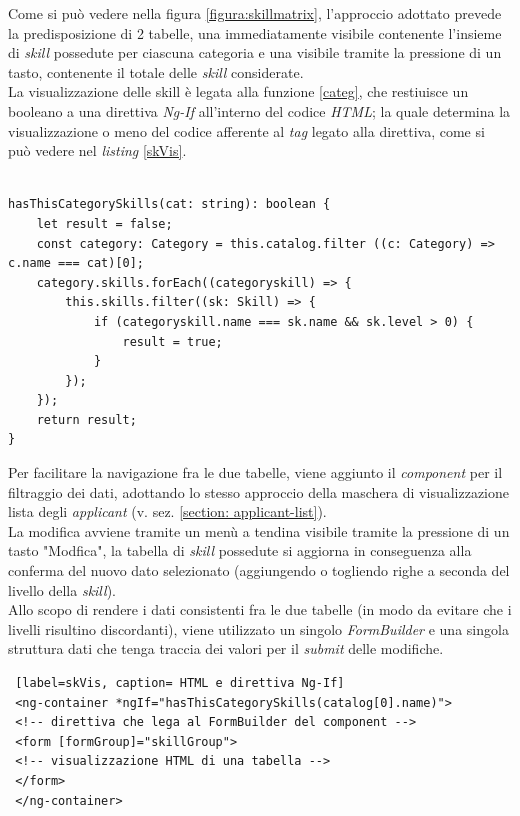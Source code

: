 Come si può vedere nella figura \ref{figura:skillmatrix}, l'approccio adottato prevede la predisposizione di 2 tabelle, una immediatamente visibile contenente l'insieme di \textit{skill} possedute per ciascuna categoria e una visibile tramite la pressione di un tasto, contenente il totale delle \textit{skill} considerate.\\
La visualizzazione delle skill è legata alla funzione \ref{categ}, che restiuisce un booleano a una direttiva \textit{Ng-If} all'interno del codice \textit{HTML}; la quale determina la visualizzazione o meno del codice afferente al \textit{tag} legato alla direttiva, come si può vedere nel \textit{listing} \ref{skVis}.\\
\newpage
\begin{lstlisting}[label=categ, caption=Funzione che determina la visualizzazione di una categoria avente \textit{skills} possedute ]

hasThisCategorySkills(cat: string): boolean {
	let result = false;
	const category: Category = this.catalog.filter ((c: Category) => c.name === cat)[0];
	category.skills.forEach((categoryskill) => {
		this.skills.filter((sk: Skill) => {
			if (categoryskill.name === sk.name && sk.level > 0) {
				result = true;
			}
		});
	});
	return result;
}

\end{lstlisting}

Per facilitare la navigazione fra le due tabelle, viene aggiunto il \textit{component} per il filtraggio dei dati, adottando lo stesso approccio della maschera di visualizzazione lista degli \textit{applicant} (v. sez. \ref{section: applicant-list}).\\
La modifica avviene tramite un menù a tendina visibile tramite la pressione di un tasto "Modfica", la tabella di \textit{skill} possedute si aggiorna in conseguenza alla conferma del nuovo dato selezionato (aggiungendo o togliendo righe a seconda del livello della \textit{skill}).\\
Allo scopo di rendere i dati consistenti fra le due tabelle (in modo da evitare che i livelli risultino discordanti), viene utilizzato un singolo \textit{FormBuilder} e una singola struttura dati che tenga traccia dei valori per il \textit{submit} delle modifiche.\\
 
 
 \begin{lstlisting} [label=skVis, caption= HTML e direttiva Ng-If]
 <ng-container *ngIf="hasThisCategorySkills(catalog[0].name)">
 <!-- direttiva che lega al FormBuilder del component -->
 <form [formGroup]="skillGroup">
 <!-- visualizzazione HTML di una tabella -->
 </form>
 </ng-container>
 \end{lstlisting}
   